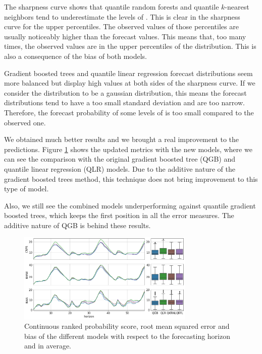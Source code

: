 \documentclass[a4paper,3p,sort&compress]{elsarticle}
\begin{document}
The sharpness curve shows that quantile random forests 
and quantile $k$-nearest
neighbors tend to underestimate the levels of
\no. This is clear in the sharpness curve for the
upper percentiles. The observed values of those percentiles are
usually noticeably higher than the forecast values. This means that,
too many times, the observed values are in the upper percentiles of
the distribution. This is also a consequence of the bias of both
models.

Gradient boosted trees and quantile linear regression forecast
distributions seem more balanced but display high values at both sides
of the sharpness curve.  If we consider the distribution to be a
gaussian distribution, this means the forecast distributions tend to
have a too small standard deviation and are too narrow. Therefore, the
forecast probability of some levels of \no is too
small compared to the observed one.

We obtained much better results and we brought a real improvement to
the predictions. Figure \ref{figure:errorGraph_rfl} shows the updated
metrics with the new models, where we can see the comparison with the
original gradient boosted tree (QGB) and quantile linear regression
(QLR) models. Due to the additive nature of the gradient boosted trees
method, this technique does not bring improvement to this type of
model.

Also, we still see the combined models underperforming against
quantile gradient boosted trees, which keeps the first position in all
the error measures. The additive nature of QGB is behind these
results. 

\begin{figure}[tbp]
  \centering
  \includegraphics[width=0.75\textwidth]{errorGraph_rfl_knnl}
  \caption{Continuous ranked probability score, root mean squared
    error and bias of the different models with respect to the
    forecasting horizon and in average.}
  \label{figure:errorGraph_rfl}
\end{figure}
\end{document}
